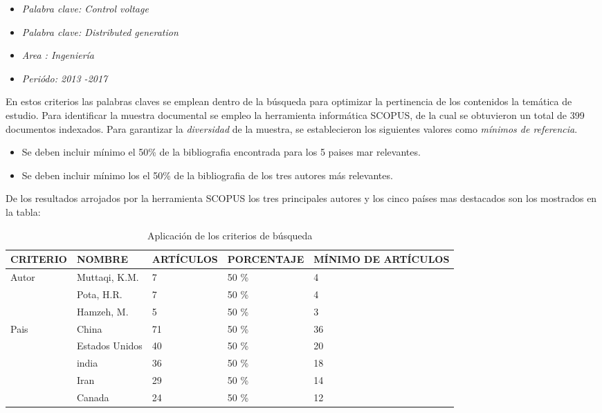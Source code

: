 \documentclass[12pt, letterpaper]{report}
\begin{document}
\begin{itemize}
    \item \textit{Palabra clave: \textit{Control voltage}}
    \item \textit{Palabra clave: \textit{Distributed generation}}
    \item \textit{Area : Ingeniería}
    \item \textit{Periódo: 2013 -2017}
\end{itemize}

En estos criterios las  palabras claves se emplean dentro de la búsqueda para optimizar la pertinencia de los contenidos la temática  de estudio. Para identificar la muestra documental se empleo la herramienta informática SCOPUS, de la cual  se obtuvieron un total de 399 documentos indexados. Para garantizar  la \textit{diversidad} de la muestra, se establecieron los siguientes valores como \textit{mínimos de referencia}.

\begin{itemize}
	\item Se deben incluir mínimo el 50\% de la bibliografia encontrada para los 5  paises mar relevantes.
	\item Se deben incluir mínimo los el 50\% de la bibliografia de los tres autores más relevantes.
\end{itemize}

De los resultados arrojados por la herramienta SCOPUS los tres principales autores y los cinco países mas destacados son los  mostrados en la tabla:\\

\begin{table}
    \caption{Aplicación de los criterios de búsqueda}
    \label{tab:criterios_busqueda }
\begin{tabular}{|l| m{3 cm}| m{3 cm}| m{3 cm} | m{2.8cm} |}
    \hline
    CRITERIO & NOMBRE &  ARTÍCULOS & PORCENTAJE & MÍNIMO DE ARTÍCULOS \\\hline
    \multirow{3}{4cm}{Autor} & Muttaqi, K.M. & 7 & 50 \% & 4\\\cline{2-5}
    & Pota, H.R.
     & 7 &50 \% & 4\\\cline{2-5}
    & Hamzeh, M.
      & 5 & 50 \% & 3\\\hline
    \multirow{5}{4 cm}{Pais} & China & 71 &50 \% & 36 \\\cline{2-5}
    & Estados Unidos & 40 &50 \% & 20 \\\cline{2-5}
    & india & 36 &50 \% & 18\\\cline{2-5}
    & Iran & 29 &50 \% & 14 \\\cline{2-5}
    & Canada & 24 &50 \% & 12\\\hline

   
\end{tabular} 
\end{table}
\end{document}
